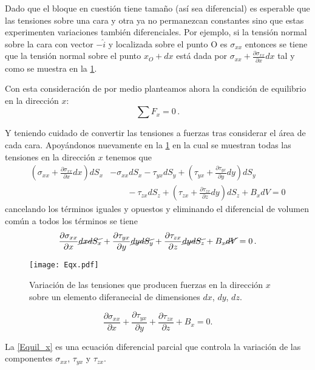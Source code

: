 \documentclass[../notas medios.tex]{subfiles}
\begin{document}
Dado que el bloque en cuestión tiene tamaño (así sea diferencial) es esperable que las tensiones sobre una cara y otra ya no permanezcan constantes sino que estas experimenten variaciones también diferenciales. Por ejemplo, si la tensión normal sobre la cara con vector $-\hat{i}$ y localizada sobre el punto O es ${\sigma _{xx}}$ entonces se tiene que la tensión normal sobre el punto $x_O+dx$ está dada por ${\sigma _{xx}} + \frac{{\partial {\sigma _{xx}}}}{{\partial x}}dx$ tal y como se muestra en la \cref{EQx}.


Con esta consideración de por medio planteamos ahora la condición de equilibrio en la dirección $x$:
\[\sum F_x = 0\, . \]

Y teniendo cuidado de convertir las tensiones a fuerzas tras considerar el área de cada cara. Apoyándonos nuevamente en la \cref{EQx} en la cual se muestran todas las tensiones en la dirección $x$ tenemos que
\begin{align*}
\left( \sigma_{xx} + \frac{\partial \sigma_{xx}}{\partial x}dx \right)d{S_x} & - {\sigma _{xx}}d{S_x} - {\tau _{yx}}d{S_y} + \left( {{\tau _{yx}} + \frac{{\partial {\tau _{yx}}}}{{\partial y}}dy} \right)d{S_y} \nonumber \\ 
&\qquad {} - {\tau _{zx}}d{S_z} + \left( {{\tau _{zx}} + \frac{{\partial {\tau _{zx}}}}{{\partial z}}dy} \right)d{S_z} + {B_x}dV = 0
\end{align*}
cancelando los términos iguales y opuestos y eliminando el diferencial de volumen común a todos los términos se tiene
\[\frac{{\partial {\sigma _{xx}}}}{{\partial x}}\cancel{dxd{S_x}} + \frac{{\partial {\tau _{yx}}}}{{\partial y}}\cancel{dyd{S_y}} + \frac{{\partial {\tau _{zx}}}}{{\partial z}}\cancel{dyd{S_z}} + {B_x}\cancel{dV} = 0\, .\]

\begin{figure}[h]
\centering
	\texttt{[image: Eqx.pdf]}
	\caption{Variación de las tensiones que producen fuerzas en la dirección $x$ sobre un elemento diferanecial de dimensiones $dx$, $dy$, $dz$.}
	\label{EQx}
\end{figure}




\begin{equation}
\frac{{\partial {\sigma _{xx}}}}{{\partial x}} + \frac{{\partial {\tau _{yx}}}}{{\partial y}} + \frac{{\partial {\tau _{zx}}}}{{\partial z}} + {B_x} = 0.
\label{Equil_x}
\end{equation}

La \cref{Equil_x} es una ecuación diferencial parcial que controla la variación de las componentes $\sigma_{xx}$, $\tau_{yx}$ y $\tau_{zx}$.
\end{document}
